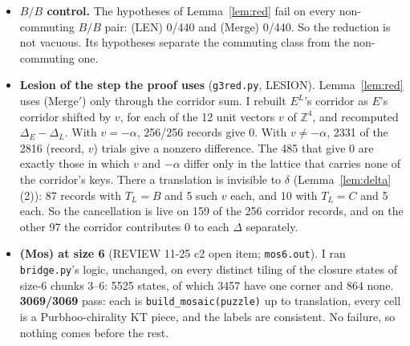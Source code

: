 \documentclass[11pt]{article}
\theoremstyle{definition}\newtheorem{definition}[theorem]{Definition}\newtheorem{remark}[theorem]{Remark}
\newcommand{\Z}{\mathbb Z}
\begin{document}
\begin{itemize}
\item \textbf{$B/B$ control.} The hypotheses of Lemma~\ref{lem:red} fail on every non-commuting $B/B$ pair: (LEN) 0/440 and (Merge) 0/440. So the reduction is not vacuous. Its hypotheses separate the commuting class from the non-commuting one.
\item \textbf{Lesion of the step the proof uses} (\texttt{g3red.py}, LESION). Lemma~\ref{lem:red} uses (Merge$'$) only through the corridor sum. I rebuilt $E^L$'s corridor as $E$'s corridor shifted by $v$, for each of the 12 unit vectors $v$ of $\Z^4$, and recomputed $\Delta_E-\Delta_L$. With $v=-\alpha$, 256/256 records give $0$. With $v\neq-\alpha$, 2331 of the 2816 (record, $v$) trials give a nonzero difference. The 485 that give $0$ are exactly those in which $v$ and $-\alpha$ differ only in the lattice that carries none of the corridor's keys. There a translation is invisible to $\delta$ (Lemma~\ref{lem:delta}(2)): 87 records with $T_L=B$ and 5 such $v$ each, and 10 with $T_L=C$ and 5 each. So the cancellation is live on 159 of the 256 corridor records, and on the other 97 the corridor contributes $0$ to each $\Delta$ separately.
\item \textbf{(Mos) at size 6} (REVIEW 11-25 c2 open item; \texttt{mos6.out}). I ran \texttt{bridge.py}'s logic, unchanged, on every distinct tiling of the closure states of size-6 chunks 3--6: 5525 states, of which 3457 have one corner and 864 none. \textbf{3069/3069} pass: each is \texttt{build\_mosaic(puzzle)} up to translation, every cell is a Purbhoo-chirality KT piece, and the labels are consistent. No failure, so nothing comes before the rest.
\end{itemize}
\end{document}
